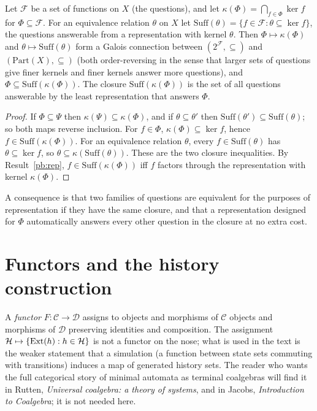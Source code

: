\begin{newresult}\label{pb:galois}
Let $\mathcal F$ be a set of functions on $X$ (the questions), and let $\kappa(\Phi)=\bigcap_{f\in\Phi}\ker f$ for $\Phi\subseteq\mathcal F$. For an equivalence relation $\theta$ on $X$ let $\mathrm{Suff}(\theta)=\{f\in\mathcal F:\theta\subseteq\ker f\}$, the questions answerable from a representation with kernel $\theta$. Then $\Phi\mapsto\kappa(\Phi)$ and $\theta\mapsto\mathrm{Suff}(\theta)$ form a Galois connection between $(2^{\mathcal F},\subseteq)$ and $(\mathrm{Part}(X),\subseteq)$ (both order-reversing in the sense that larger sets of questions give finer kernels and finer kernels answer more questions), and $\Phi\subseteq\mathrm{Suff}(\kappa(\Phi))$. The closure $\mathrm{Suff}(\kappa(\Phi))$ is the set of all questions answerable by the least representation that answers $\Phi$.
\end{newresult}
\begin{proof}
If $\Phi\subseteq\Psi$ then $\kappa(\Psi)\subseteq\kappa(\Phi)$, and if $\theta\subseteq\theta'$ then $\mathrm{Suff}(\theta')\subseteq\mathrm{Suff}(\theta)$; so both maps reverse inclusion. For $f\in\Phi$, $\kappa(\Phi)\subseteq\ker f$, hence $f\in\mathrm{Suff}(\kappa(\Phi))$. For an equivalence relation $\theta$, every $f\in\mathrm{Suff}(\theta)$ has $\theta\subseteq\ker f$, so $\theta\subseteq\kappa(\mathrm{Suff}(\theta))$. These are the two closure inequalities. By Result~\ref{pb:rep}, $f\in\mathrm{Suff}(\kappa(\Phi))$ iff $f$ factors through the representation with kernel $\kappa(\Phi)$.
\end{proof}

A consequence is that two families of questions are equivalent for the purposes of representation if they have the same closure, and that a representation designed for $\Phi$ automatically answers every other question in the closure at no extra cost.

\section{Functors and the history construction}

A \emph{functor} $F:\mathcal C\to\mathcal D$ assigns to objects and morphisms of $\mathcal C$ objects and morphisms of $\mathcal D$ preserving identities and composition. The assignment $\mathcal{H}\mapsto\{\operatorname{Ext}(h):h\in\mathcal{H}\}$ is not a functor on the nose; what is used in the text is the weaker statement that a simulation (a function between state sets commuting with transitions) induces a map of generated history sets. The reader who wants the full categorical story of minimal automata as terminal coalgebras will find it in Rutten, \emph{Universal coalgebra: a theory of systems}, and in Jacobs, \emph{Introduction to Coalgebra}; it is not needed here.

